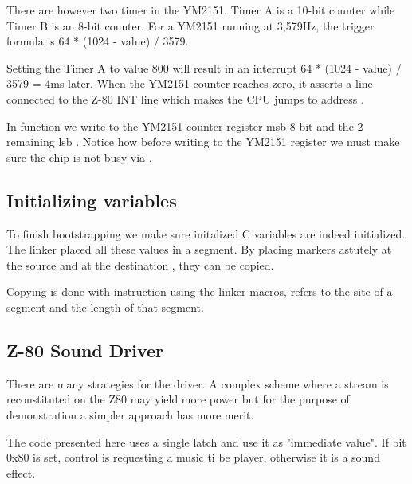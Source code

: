 There are however two timer in the YM2151. Timer A is a 10-bit counter while Timer B is an 8-bit counter. For a YM2151 running at 3,579Hz, the trigger formula is 64 * (1024 - value) / 3579.

Setting the Timer A to value 800 will result in an interrupt 64 * (1024 - value) / 3579 = 4ms later. When the YM2151 counter reaches zero, it asserts a line connected to the Z-80 INT line which makes the CPU jumps to address .



In function  we write to the YM2151 counter register msb 8-bit  and the 2 remaining lsb . Notice how before writing to the YM2151 register we must make sure the chip is not busy via .





\subsection{Initializing variables}
To finish bootstrapping we make sure initalized C variables are indeed initialized. The linker placed all these values in a  segment. By placing markers astutely at the source  and at the destination , they can be copied.



Copying is done with  instruction using the linker macros,  refers to the site of a segment and  the length of that segment.


 



\subsection{Z-80 Sound Driver}
There are many strategies for the driver. A complex scheme where a stream is reconstituted on the Z80 may yield more power but for the purpose of demonstration a simpler approach has more merit.

The code presented here uses a single latch and use it as "immediate value". If bit 0x80 is set, control is requesting a music ti be player, otherwise it is a sound effect. 

